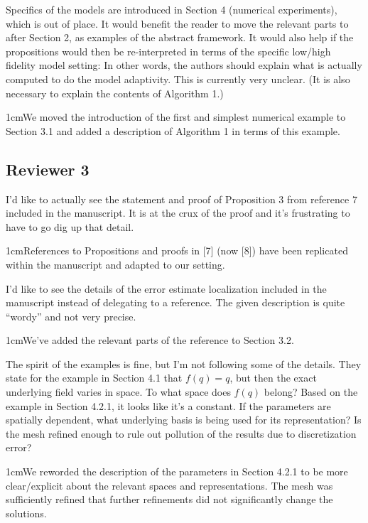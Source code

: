 \documentclass[12pt, letterpaper]{article}
\newcommand{\answer}[1]{\begin{adjustwidth}{1cm}{}{\color{blue}#1}\end{adjustwidth}}
\begin{document}
Specifics of the models are introduced in Section 4 (numerical experiments), which is out of place. It would benefit the reader to move the relevant parts to after Section 2, as examples of the abstract framework. It would also help if the propositions would then be re-interpreted in terms of the specific low/high fidelity model setting: In other words, the authors should explain what is actually computed to do the model adaptivity. This is currently very unclear. (It is also necessary to explain the contents of Algorithm 1.)

\answer{We moved the introduction of the first and simplest numerical example to Section 3.1 and added a description of Algorithm 1 in terms of this example.}


\subsection*{Reviewer 3}

I'd like to actually see the statement and proof of Proposition 3 from reference 7 included in
the manuscript. It is at the crux of the proof and it's frustrating to have to go dig up that
detail.

\answer{References to Propositions and proofs in [7] (now [8]) have been replicated within the manuscript and adapted to our setting.}

I'd like to see the details of the error estimate localization included in the manuscript instead
of delegating to a reference. The given description is quite “wordy” and not very precise.

\answer{We've added the relevant parts of the reference to Section 3.2.}

The spirit of the examples is fine, but I'm not following some of the details. They state for
the example in Section 4.1 that $f (q) = q$, but then the exact underlying field varies in space.
To what space does $f (q)$ belong? Based on the example in Section 4.2.1, it looks like it's
a constant. If the parameters are spatially dependent, what underlying basis is being used
for its representation? Is the mesh refined enough to rule out pollution of the results due to
discretization error?

\answer{We reworded the description of the parameters in Section 4.2.1 to be more clear/explicit about the relevant spaces and representations. The mesh was sufficiently refined that further refinements did not significantly change the solutions.}
\end{document}
